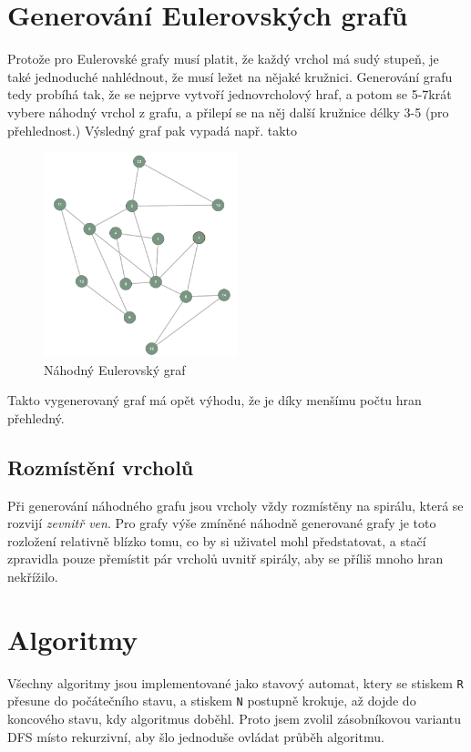 \documentclass{article}
\def\code#1{\texttt{#1}}
\begin{document}
\section{Generování Eulerovských grafů}

Protože pro Eulerovské grafy musí platit, že každý vrchol má sudý
stupeň, je také jednoduché nahlédnout, že musí ležet na nějaké kružnici.
Generování grafu tedy probíhá tak, že se nejprve vytvoří jednovrcholový
hraf, a potom se 5-7krát vybere náhodný vrchol z grafu, a přilepí se na
něj další kružnice délky 3-5 (pro přehlednost.) Výsledný graf pak vypadá např. takto

\begin{figure}[!h]
  \centering
    \includegraphics[width=0.5\textwidth]{LQNxfKa.png}
  \caption{Náhodný Eulerovský graf}
\end{figure}

Takto vygenerovaný graf má opět výhodu, že je díky menšímu počtu hran přehledný.

\subsection{Rozmístění vrcholů}

Při generování náhodného grafu jsou vrcholy vždy rozmístěny na spirálu,
která se rozvijí \emph{zevnitř ven}. Pro grafy výše zmíněné náhodně
generované grafy je toto rozložení relativně blízko tomu, co by si
uživatel mohl předstatovat, a stačí zpravidla pouze přemístit pár
vrcholů uvnitř spirály, aby se příliš mnoho hran nekřížilo.

\section{Algoritmy}

Všechny algoritmy jsou implementované jako stavový automat, ktery se
stiskem \code{R} přesune do počátečního stavu, a stiskem \code{N} postupně
krokuje, až dojde do koncového stavu, kdy algoritmus doběhl. Proto jsem zvolil
zásobníkovou variantu DFS místo rekurzivní, aby šlo jednoduše ovládat průběh algoritmu.
\end{document}
